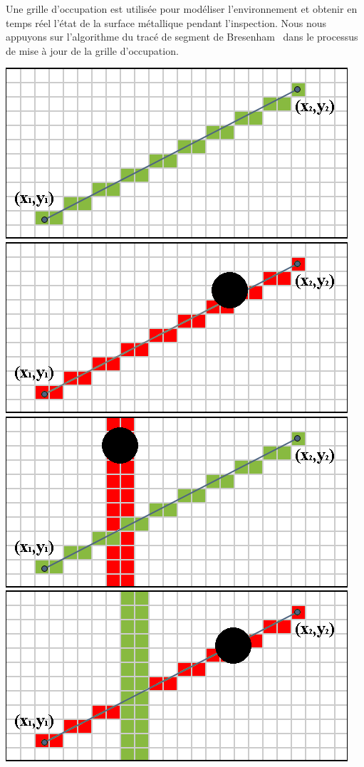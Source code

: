 \documentclass[a0paper,portrait]{baposter}
\begin{document}
\begin{poster}
{			Une grille d'occupation est utilisée pour modéliser l'environnement et obtenir en temps réel l'état de la surface métallique pendant l'inspection.
			Nous nous appuyons sur l'algorithme du tracé de segment de Bresenham~\cite{enwiki:1155124335} dans le processus de mise à jour de la grille d'occupation.
			\begin{center}
				\includegraphics[width=0.45\linewidth]{graphics/Bresenham_line.png}
				\includegraphics[width=0.45\linewidth]{graphics/Bresenham_line_2.png}
				\includegraphics[width=0.45\linewidth]{graphics/Bresenham_line_3.png}
				\includegraphics[width=0.45\linewidth]{graphics/Bresenham_line_4.png}
			\end{center}
		}
\end{poster}
\end{document}
